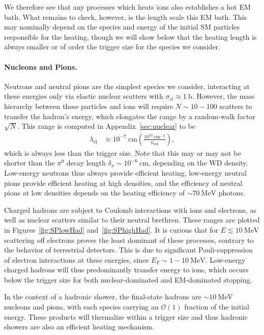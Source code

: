 \documentclass[twocolumn, preprintnumbers,amsmath,amssymb,prd, superscriptaddress]{revtex4}
\newcommand{\OO}{\mathcal{O}}
\newcommand{\MeV}{\text{MeV}}
\def\r{\right)}
\def\l{\left(}
\begin{document}
We therefore see that any processes which heats ions also establishes a hot EM bath.
What remains to check, however, is the length scale this EM bath.
This may nominally depend on the species and energy of the initial SM particles responsible for the heating, though we will show below that the heating length is always smaller or of order the trigger size for the species we consider.

\paragraph{Nucleons and Pions.}
Neutrons and neutral pions are the simplest species we consider, interacting at these energies only via elastic nuclear scatters with $\sigma_\text{el} \approx 1 ~\text{b}$.
However, the mass hierarchy between these particles and ions will require $N \sim 10 - 100$ scatters to transfer the hadron's energy, which elongates the range by a random-walk factor $\sqrt{N}$.
This range is computed in Appendix~\ref{sec:nuclear} to be
\begin{align}
 \lambda_\text{el} &\approx
 10^{-7} ~\text{cm} \l\frac{10^{32}~\text{cm}^{-3}}{n_\text{ion}}\r,
\end{align}
which is always less than the trigger size.
Note that this may or may not be shorter than the $\pi^0$ decay length $\delta_\pi \sim 10^{-6} ~\text{cm}$, depending on the WD density.
Low-energy neutrons thus always provide efficient heating, low-energy neutral pions provide efficient heating at high densities, and the efficiency of neutral pions at low densities depends on the heating efficiency of $\sim 70~\text{MeV}$ photons.

Charged hadrons are subject to Coulomb interactions with ions and electrons, as well as nuclear scatters similar to their neutral brethren.
These ranges are plotted in Figures~\ref{fig:SPlowHad} and~\ref{fig:SPhighHad}.
It is curious that for $E \lesssim 10~\MeV$ scattering off electrons proves the least dominant of these processes, contrary to the behavior of terrestrial detectors.
This is due to significant Pauli-suppression of electron interactions at these energies, since $E_F \sim 1-10~\MeV$.
Low-energy charged hadrons will thus predominantly transfer energy to ions, which occurs below the trigger size for both nuclear-dominated and EM-dominated stopping.

In the context of a hadronic shower, the final-state hadrons are $\sim10~\MeV$ nucleons and pions, with each species carrying an $\OO(1)$ fraction of the initial energy.
These products will thermalize within a trigger size and thus hadronic showers are also an efficient heating mechanism.
\end{document}
